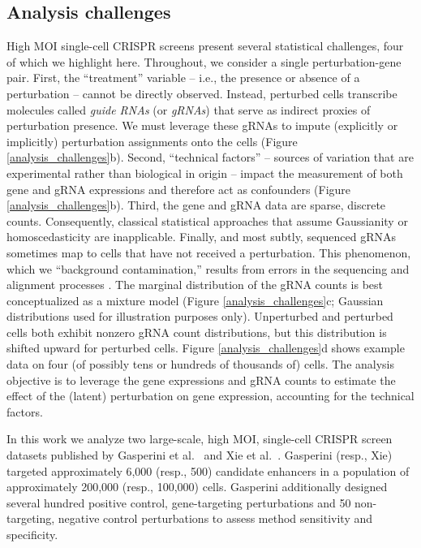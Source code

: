 \documentclass[11pt]{article}
\begin{document}
\subsection{Analysis challenges}
High MOI single-cell CRISPR screens present several statistical challenges, four of which we highlight here. Throughout, we consider a single perturbation-gene pair. First, the ``treatment'' variable -- i.e., the presence or absence of a perturbation -- cannot be directly observed. Instead, perturbed cells transcribe molecules called  \textit{guide RNAs} (or \textit{gRNAs}) that serve as indirect proxies of perturbation presence. We must leverage these gRNAs to impute (explicitly or implicitly) perturbation assignments onto the cells (Figure \ref{analysis_challenges}b). Second, ``technical factors'' -- sources of variation that are experimental rather than biological in origin -- impact the measurement of both gene and gRNA expressions and therefore act as confounders (Figure \ref{analysis_challenges}b). Third, the gene and gRNA data are sparse, discrete counts. Consequently, classical statistical approaches that assume Gaussianity or homoscedasticity are inapplicable. Finally, and most subtly, sequenced gRNAs sometimes map to cells that have not received a perturbation. This phenomenon, which we ``background contamination,'' results from errors in the sequencing and alignment processes \cite{Replogle2020}. The marginal distribution of the gRNA counts is best conceptualized as a mixture model (Figure \ref{analysis_challenges}c; Gaussian distributions used for illustration purposes only). Unperturbed and perturbed cells both exhibit nonzero gRNA count distributions, but this distribution is shifted upward for perturbed cells. Figure \ref{analysis_challenges}d shows example data on four (of possibly tens or hundreds of thousands of) cells. The analysis objective is to leverage the gene expressions and gRNA counts to estimate the effect of the (latent) perturbation on gene expression, accounting for the technical factors.

In this work we analyze two large-scale, high MOI, single-cell CRISPR screen datasets published by Gasperini et al.\ \cite{Gasperini2019} and Xie et al.\ \cite{Xie2019a}. Gasperini (resp., Xie) targeted approximately 6,000 (resp., 500) candidate enhancers in a population of approximately 200,000 (resp., 100,000) cells. Gasperini additionally designed several hundred positive control, gene-targeting perturbations and 50 non-targeting, negative control perturbations to assess method sensitivity and specificity.
\end{document}
